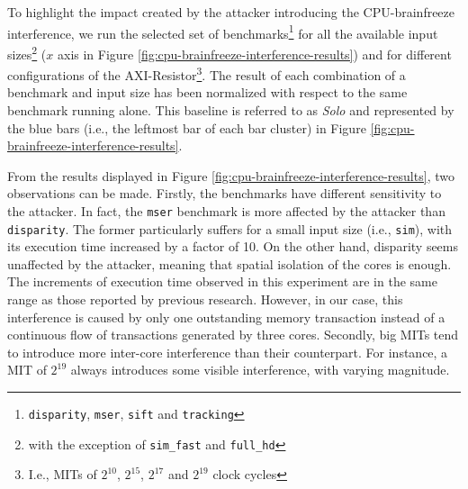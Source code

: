 
    To highlight the impact created by the attacker introducing the CPU-brainfreeze interference, we run the selected set of benchmarks\footnote{\texttt{disparity}, \texttt{mser}, \texttt{sift} and \texttt{tracking}} for all the available input sizes\footnote{with the exception of \texttt{sim\_fast} and \texttt{full\_hd}} ($x$ axis in Figure \ref{fig:cpu-brainfreeze-interference-results}) and for different configurations of the AXI-Resistor\footnote{I.e., MITs of $2^{10}$, $2^{15}$, $2^{17}$ and $2^{19}$ clock cycles}.
    The result of each combination of a benchmark and input size has been normalized with respect to the same benchmark running alone.
    This baseline is referred to as \emph{Solo} and represented by the blue bars (i.e., the leftmost bar of each bar cluster) in Figure \ref{fig:cpu-brainfreeze-interference-results}.

    From the results displayed in Figure \ref{fig:cpu-brainfreeze-interference-results}, two observations can be made.
    Firstly, the benchmarks have different sensitivity to the attacker. In fact, the \texttt{mser} benchmark is more affected by the attacker than \texttt{disparity}.
    The former particularly suffers for a small input size (i.e., \texttt{sim}), with its execution time increased by a factor of 10.
    On the other hand, disparity seems unaffected by the attacker, meaning that spatial isolation of the cores is enough.
    The increments of execution time observed in this experiment are in the same range as those reported by previous research.
    However, in our case, this interference is caused by only one outstanding memory transaction instead of a continuous flow of transactions generated by three cores.
    Secondly, big MITs tend to introduce more inter-core interference than their counterpart. For instance, a MIT of $2^{19}$ always introduces some visible interference, with varying magnitude.\\

